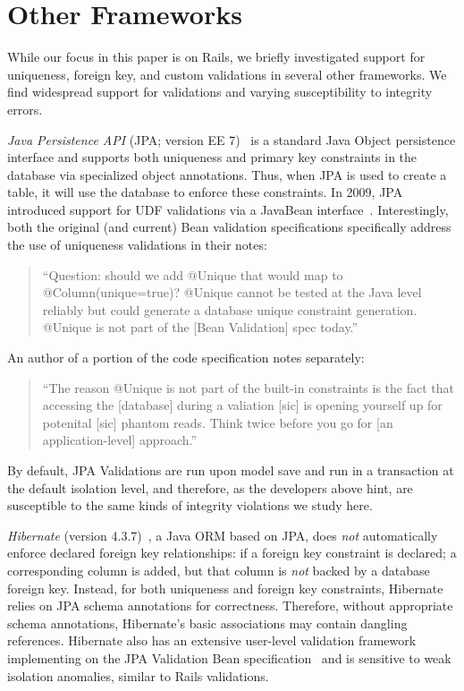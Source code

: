 
\section{Other Frameworks}
\label{sec:other-orms}

While our focus in this paper is on Rails, we briefly investigated
support for uniqueness, foreign key, and custom validations in several
other frameworks. We find widespread support for validations and
varying susceptibility to integrity errors.

\newcommand{\orm}[1]{{\vspace{.45em}\noindent\textit{#1}}}

\orm{Java Persistence API} (JPA; version EE 7)~\cite{code-jpa} is a
standard Java Object persistence interface and supports both
uniqueness and primary key constraints in the database via specialized
object annotations. Thus, when JPA is used to create a table, it will
use the database to enforce these constraints. In 2009, JPA introduced
support for UDF validations via a JavaBean
interface~\cite{code-bean-validation}. Interestingly, both the
original (and current) Bean validation specifications specifically
address the use of uniqueness validations in their notes:
\begin{quote}
``Question: should we add @Unique that would map to @Column(unique=true)?
@Unique cannot be tested at the Java level reliably but could generate
a database unique constraint generation. @Unique is not part
of the [Bean Validation] spec today.''~\cite{jsr-bean}
\end{quote}
An author of a portion of the code specification notes separately:
\begin{quote}
  ``The reason @Unique is not part of the built-in constraints is the
  fact that accessing the [database] during a valiation [sic] is
  opening yourself up for potenital [sic] phantom reads. Think twice
  before you go for [an application-level] approach.''~\cite{unique-bean}
\end{quote}
By default, JPA Validations are run upon model save and run in a
transaction at the default isolation level, and therefore, as the
developers above hint, are susceptible to the same kinds of integrity
violations we study here.

\orm{Hibernate} (version 4.3.7)~\cite{code-hibernate}, a Java ORM
based on JPA, does \textit{not} automatically enforce declared foreign
key relationships: if a foreign key constraint is declared; a
corresponding column is added, but that column is \textit{not} backed by a
database foreign key. Instead, for both uniqueness and foreign key
constraints, Hibernate relies on JPA schema annotations for
correctness. Therefore, without appropriate schema annotations,
Hibernate's basic associations may contain dangling references. Hibernate also has an extensive user-level validation
framework implementing on the JPA Validation Bean
specification~\cite{code-hibernate-validator} and is sensitive to weak
isolation anomalies, similar to Rails validations.

